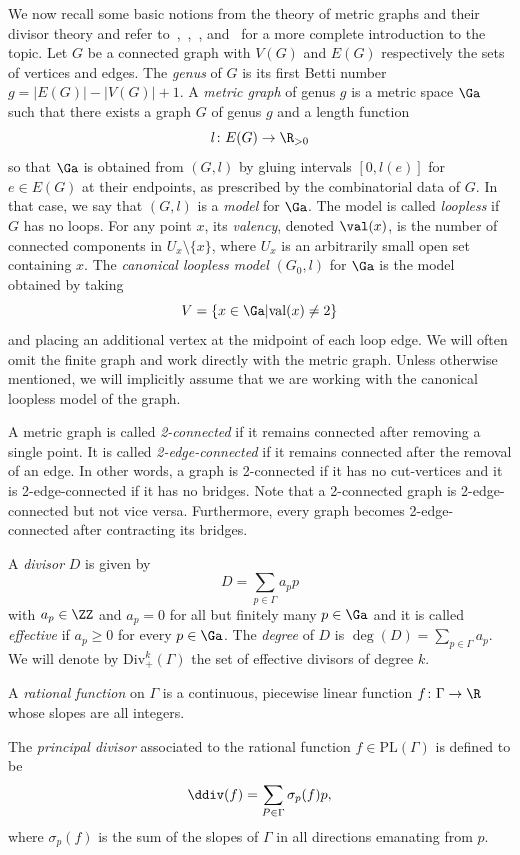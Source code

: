 We now recall some basic notions from the theory of metric graphs and their divisor theory and refer to~\cite{BN09},~\cite{BF11},~\cite{BC}, and~\cite{Len_Survey}  for a more complete introduction to the topic. 	
Let $G$ be a connected graph with $V(G)$ and $E(G)$  respectively the sets of vertices and edges. The \emph{genus} of $G$ is its  first Betti number $g=|E(G)|-|V(G)|+1$. 
A \emph{metric graph} of genus $g$ is a metric space $\Ga$ such that there exists a graph $G$ of genus $g$ and a length function \[l\colon E(G)\to \R_{>0}\]
so that $\Ga$ is obtained from $(G,l)$ by gluing intervals $[0,l(e)]$ for  $e\in E(G)$ at their endpoints, as prescribed by the combinatorial data of $G$. In that case, we say that $(G,l)$ is a \emph{model} for $\Ga$.  The model is called \emph{loopless} if $G$ has no loops. 
  For any point $x$, its \emph{valency}, denoted  $\val(x)$, is  the number of connected components in $U_x\setminus\{x\}$, where $U_x$ is an arbitrarily small open set containing $x$.   
  The \emph{canonical loopless model} $(G_0,l)$ for $\Ga$ is the model obtained by taking
\[
V=\{x\in\Ga|\mathrm{val}(x)\ne 2 \}
\]
and placing an additional vertex at the midpoint of each loop edge. We will often omit the finite graph and work directly with the metric graph. Unless otherwise mentioned, we will implicitly assume that we are working with the canonical  loopless model of the graph. 


A metric graph is called \emph{2-connected} if it remains connected after removing a single point. It is called \emph{2-edge-connected} if it remains connected after the removal of an edge. In other words, a graph is 2-connected if it has no cut-vertices and it is  2-edge-connected if it has no bridges. Note that a 2-connected graph is 2-edge-connected but not vice versa. Furthermore, every graph becomes 2-edge-connected after contracting its bridges. 
 
 A \emph{divisor} $D$ is given by \[D=\sum_{p\in \Gamma}a_pp\] with $a_p\in\ZZ$ and $a_p=0$ for all but finitely many $p\in \Ga$ and 
it is called \emph{effective} if $a_p\geq 0$ for every $p\in\Ga$.
The \emph{degree} of $D $ is $\deg(D)=\sum_{p\in\Gamma}a_p$. 
We will denote by $ \mathrm{Div}^k_+(\Gamma)$ the set of effective divisors of degree $k$.
 
	A \emph{rational function} on $\Gamma$ is a continuous, piecewise linear function $f\colon \Gamma\to \R$  whose slopes are all integers. 
 
	The \emph{principal divisor} associated to the rational function $f\in \mathrm{PL}(\Gamma)$ is defined to be 
	\[
	\ddiv(f)=\sum_{P\in \Gamma}\sigma_p(f)p,
	\]
	 where $\sigma_p(f)$ is the sum of the slopes of $\Gamma$ in all directions emanating from $p$. 
    

